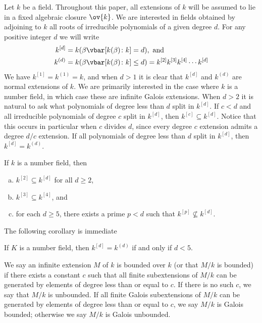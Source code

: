 Let $k$ be a field. Throughout this paper, all extensions of $k$ will be assumed to lie in a fixed algebraic closure $\ov{k}$. We are interested in fields obtained by adjoining to $k$ all roots of irreducible polynomials of a given degree $d$. For any positive integer $d$ we will write
	\[
	\begin{aligned}
	k^{[d]}&= k(\beta \vbar [k(\beta) \colon k]= d), \text{ and} \\
	k^{(d)}&= k(\beta \vbar [k(\beta) \colon k] \leq d)= k^{[2]} k^{[3]} k^{[4]} \cdots k^{[d]}
	\end{aligned}
	\]
We have $k^{[1]}= k^{(1)}= k$, and when $d>1$ it is clear that $k^{[d]}$ and $k^{(d)}$ are normal extensions of $k$. We are primarily interested in the case where $k$ is a number field, in which case these are infinite Galois extensions. When $d > 2$ it is natural to ask what polynomials of degree less than $d$ split in $k^{[d]}$. If $c < d$ and all irreducible polynomials of degree $c$ split in $k^{[d]}$, then $k^{[c]} \subseteq k^{[d]}$. Notice that this occurs in particular when $c$ divides $d$, since every degree $c$ extension admits a degree $d/c$ extension. If all polynomials of degree less than $d$ split in $k^{[d]}$, then $k^{[d]}= k^{(d)}$. 


\begin{thm}[1]
If $k$ is a number field, then
	\begin{enumerate}[(a)]
	\item $k^{[2]} \subseteq k^{[d]}$ for all $d \geq 2$,
	\item $k^{[3]} \subseteq k^{[4]}$, and 
	\item for each $d \geq 5$, there exists a prime $p < d$ such that $k^{[p]} \not\subseteq k^{[d]}$. 
	\end{enumerate}
\end{thm}


The following corollary is immediate


\begin{cor}[2]
If $K$ is a number field, then $k^{[d]}= k^{(d)}$ if and only if $d < 5$. 
\end{cor}


\begin{dfn}
We say an infinite extension $M$ of $k$ is bounded over $k$ (or that $M/k$ is bounded) if there exists a constant $c$ such that all finite subextensions of $M/k$ can be generated by elements of degree less than or equal to $c$. If there is no such $c$, we say that $M/k$ is unbounded. If all finite Galois subextensions of $M/k$ can be generated by elements of degree less than or equal to $c$, we say $M/k$ is Galois bounded; otherwise we say $M/k$ is Galois unbounded.
\end{dfn}


